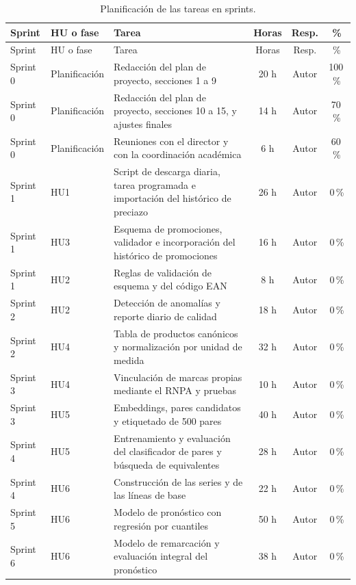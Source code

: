 \documentclass[
11pt, %
]{charter}
\begin{document}
\begin{longtable}{@{}|p{1.3cm}|p{2.2cm}|p{6.2cm}|c|c|c|@{}}
\caption{Planificación de las tareas en sprints.}
\label{tab:sprints}\\
\hline
\rowcolor[HTML]{C0C0C0}
Sprint & HU o fase & Tarea & Horas & Resp. & \% \\ \hline
\endfirsthead
\hline
\rowcolor[HTML]{C0C0C0}
Sprint & HU o fase & Tarea & Horas & Resp. & \% \\ \hline
\endhead
Sprint 0 & Planificación & Redacción del plan de proyecto, secciones 1 a 9 & 20 h & Autor & 100\,\% \\ \hline
Sprint 0 & Planificación & Redacción del plan de proyecto, secciones 10 a 15, y ajustes finales & 14 h & Autor & 70\,\% \\ \hline
Sprint 0 & Planificación & Reuniones con el director y con la coordinación académica & 6 h & Autor & 60\,\% \\ \hline
Sprint 1 & HU1 & Script de descarga diaria, tarea programada e importación del histórico de preciazo & 26 h & Autor & 0\,\% \\ \hline
Sprint 1 & HU3 & Esquema de promociones, validador e incorporación del histórico de promociones & 16 h & Autor & 0\,\% \\ \hline
Sprint 1 & HU2 & Reglas de validación de esquema y del código EAN & 8 h & Autor & 0\,\% \\ \hline
Sprint 2 & HU2 & Detección de anomalías y reporte diario de calidad & 18 h & Autor & 0\,\% \\ \hline
Sprint 2 & HU4 & Tabla de productos canónicos y normalización por unidad de medida & 32 h & Autor & 0\,\% \\ \hline
Sprint 3 & HU4 & Vinculación de marcas propias mediante el RNPA y pruebas & 10 h & Autor & 0\,\% \\ \hline
Sprint 3 & HU5 & Embeddings, pares candidatos y etiquetado de 500 pares & 40 h & Autor & 0\,\% \\ \hline
Sprint 4 & HU5 & Entrenamiento y evaluación del clasificador de pares y búsqueda de equivalentes & 28 h & Autor & 0\,\% \\ \hline
Sprint 4 & HU6 & Construcción de las series y de las líneas de base & 22 h & Autor & 0\,\% \\ \hline
Sprint 5 & HU6 & Modelo de pronóstico con regresión por cuantiles & 50 h & Autor & 0\,\% \\ \hline
Sprint 6 & HU6 & Modelo de remarcación y evaluación integral del pronóstico & 38 h & Autor & 0\,\% \\ \hline

\end{longtable}
\end{document}
